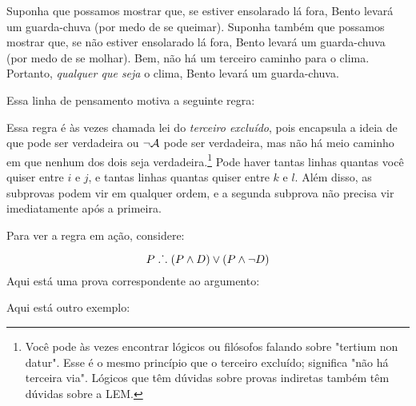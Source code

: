Suponha que possamos mostrar que, se estiver ensolarado l\'a fora, Bento levar\'a um guarda-chuva (por medo de se queimar). Suponha   tamb\'em que possamos mostrar que, se n\~ao estiver ensolarado l\'a fora, Bento levar\'a um guarda-chuva (por medo de se molhar). Bem, n\~ao h\'a um terceiro caminho para o clima. Portanto, \emph{qualquer que seja}   o clima, Bento levar\'a um guarda-chuva.

Essa linha de pensamento motiva a seguinte regra:

 Essa regra   \'e  \`as vezes   chamada lei do  \emph{terceiro exclu\'ido}, pois encapsula a ideia de que  pode ser verdadeira ou $\neg \mathcal{A}$ pode ser verdadeira, mas n\~ao h\'a meio caminho em que nenhum dos dois seja verdadeira.\footnote{Voc\^e pode \`as vezes encontrar l\'ogicos ou fil\'osofos falando sobre "tertium non datur". Esse \'e o mesmo princ\'ipio que o terceiro exclu\'ido; significa "n\~ao h\'a terceira via". L\'ogicos que t\^em d\'uvidas sobre provas indiretas tamb\'em t\^em d\'uvidas sobre a LEM.} Pode haver tantas linhas quantas voc\^e quiser entre $i$ e $j$, e tantas linhas quantas quiser entre $k$ e $l$.  Al\'em disso, as subprovas podem vir em qualquer ordem, e a segunda subprova n\~ao precisa vir imediatamente ap\'os a primeira.

Para ver a regra em a\c c\~ao, considere:
 
	$$P \mathrel{\ldotp\dot{}\,\ldotp} (P \wedge D) \vee (P \wedge \neg D)$$
Aqui est\'a uma prova correspondente ao argumento:
	\begin{fitchproof}
		\open
		\close
		\open
		\close
	\end{fitchproof}
Aqui est\'a outro exemplo:
\begin{fitchproof}
	\hypo{ana}{A \eif \enot A}
	\open
		\hypo{a}{A}
		\ce{ana, a}
	\close
	\open
		\hypo{na1}{\enot A}
		\by{R}{na1}
	\close
	\tnd{a-na, na1-na2}
\end{fitchproof}


